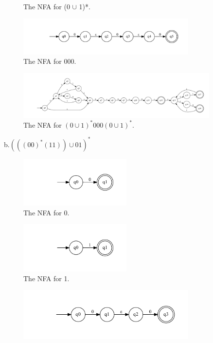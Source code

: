\documentclass[10pt] {article}
\begin{document}
\begin{enumerate}
\begin{figure}[H]
\caption{The NFA for (0 $\cup$ 1)*.}
\label{4}
\end{figure}
\begin{figure}[H]
\includegraphics[width=0.8\textwidth]{ae19.pdf}
\caption{The NFA for 000.}
\label{5}
\end{figure}
\begin{figure}[H]
\includegraphics[width=0.9\textwidth]{af19.pdf}
\caption{The NFA for $(0 \cup 1)^*000(0 \cup 1)^*$.}
\label{6}
\end{figure}
b.$(((00)^*(11))\cup 01)^*$
\begin{figure}[H]
\includegraphics[width=0.5\textwidth]{aa19.pdf}
\caption{The NFA for 0.}
\label{7}
\end{figure}
\begin{figure}[H]
\includegraphics[width=0.5\textwidth]{ab19.pdf}
\caption{The NFA for 1.}
\label{8}
\end{figure}
\begin{figure}[H]
\includegraphics[width=0.8\textwidth]{ba19.pdf}

\end{figure}
\end{enumerate}
\end{document}

